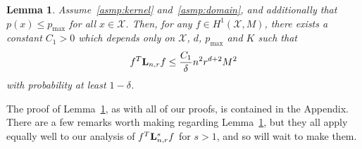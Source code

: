 \documentclass{article}
\newcommand{\1}{\mathbf{1}}
\newcommand{\Lap}{{\bf L}}
\newcommand{\Xset}{\mathcal{X}}
\theoremstyle{alden}
\theoremstyle{aldenthm}
\newtheorem{lemma}{Lemma}
\theoremstyle{definition}
\theoremstyle{remark}
\begin{document}
\begin{lemma}
	\label{lem:first_order_graph_sobolev_seminorm}
	Assume~\ref{asmp:kernel} and~\ref{asmp:domain}, and additionally that $p(x) \leq p_{\max}$ for all $x \in \Xset$. Then, for any $f \in H^1(\Xset,M)$, there exists a constant $C_1 > 0$ which depends only on $\Xset$, $d$, $p_{\max}$ and $K$ such that
	\begin{equation}
	\label{eqn:first_order_graph_sobolev_seminorm}
	f^T \Lap_{n,r} f \leq \frac{C_1}{\delta} n^2 r^{d + 2} M^2
	\end{equation}
	with probability at least $1 - \delta$.
\end{lemma}
The proof of Lemma~\ref{lem:first_order_graph_sobolev_seminorm}, as with all of our proofs, is contained in the Appendix. There are a few remarks worth making regarding Lemma~\ref{lem:first_order_graph_sobolev_seminorm}, but they all apply equally well to our analysis of $f^T\Lap_{{n,r}}^sf$ for $s > 1$, and so will wait to make them.
\end{document}
